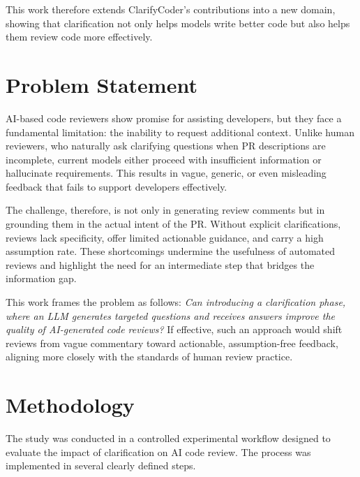 \documentclass[conference]{IEEEtran}
\begin{document}
This work therefore extends ClarifyCoder’s contributions into a new domain, showing that clarification not only helps models write better code but also helps them review code more effectively.

\section{Problem Statement}
AI-based code reviewers show promise for assisting developers, but they face a fundamental limitation: the inability to request additional context. Unlike human reviewers, who naturally ask clarifying questions when PR descriptions are incomplete, current models either proceed with insufficient information or hallucinate requirements. This results in vague, generic, or even misleading feedback that fails to support developers effectively.

The challenge, therefore, is not only in generating review comments but in grounding them in the actual intent of the PR. Without explicit clarifications, reviews lack specificity, offer limited actionable guidance, and carry a high assumption rate. These shortcomings undermine the usefulness of automated reviews and highlight the need for an intermediate step that bridges the information gap.

This work frames the problem as follows: \emph{Can introducing a clarification phase, where an LLM generates targeted questions and receives answers improve the quality of AI-generated code reviews?} If effective, such an approach would shift reviews from vague commentary toward actionable, assumption-free feedback, aligning more closely with the standards of human review practice.

\section{Methodology}
The study was conducted in a controlled experimental workflow designed to evaluate the impact of clarification on AI code review. The process was implemented in several clearly defined steps.
\end{document}
